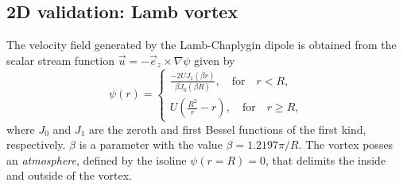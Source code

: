 \documentclass{article}
\begin{document}
\subsection{2D validation: Lamb vortex}

The velocity field generated by the Lamb-Chaplygin dipole is obtained from the scalar stream function $\vec{u} = -\vec{e}_z\times \nabla \psi$ given by
\begin{equation}
    \psi(r) = \begin{cases}
    \frac{-2UJ_1(\beta r)}{\beta J_0(\beta R)}, \quad \text{for} \quad r < R,\\
    U\left(\frac{R^2}{r}-r\right), \quad \text{for} \quad r \ge R,    \end{cases}
\end{equation}
where $J_0$ and $J_1$ are the zeroth and first Bessel functions of the first kind, respectively. $\beta$ is a parameter with the value $\beta=1.2197\pi/R$. The vortex posses an \emph{atmosphere}, defined by the isoline $\psi(r=R)=0$, that delimits the inside and outside of the vortex.
\end{document}
